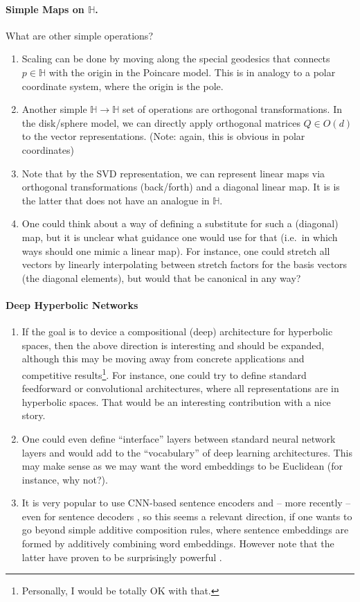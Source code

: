 \documentclass{article}
\begin{document}
\paragraph{Simple Maps on $\mathbb H$.}
What are other simple operations? 
\begin{enumerate}
\item Scaling can be done by moving along the special geodesics that connects $p \in \mathbb H$ with the origin in the Poincare model. This is in analogy to a polar coordinate system, where the origin is the pole.
\item  Another simple $\mathbb H \to \mathbb H$ set of operations are orthogonal transformations. In the disk/sphere model, we can directly apply orthogonal matrices $Q \in O(d)$ to the vector representations. (Note: again, this is obvious in polar coordinates)  
\item Note that by the SVD representation, we can represent linear maps via orthogonal transformations (back/forth) and a diagonal linear map. It is is the latter that does not have an analogue in $\mathbb H$. 
\item One could think about a way of defining a substitute for such a (diagonal) map, but it is unclear what guidance one would use for that (i.e.~in which ways should one mimic a linear map). For instance, one could stretch all vectors by linearly interpolating between stretch factors for the basis vectors (the diagonal elements), but would that be canonical in any way? 
\end{enumerate}

\paragraph{Deep Hyperbolic Networks}

\begin{enumerate}
\item If the goal is to device a compositional (deep) architecture for hyperbolic spaces, then the above direction is interesting and should be expanded, although this may be moving away from concrete applications and competitive results\footnote{Personally, I would be totally OK with that.}. For instance, one could try to define standard feedforward or convolutional architectures, where all representations are in hyperbolic spaces. That would be an interesting contribution with a nice story. 
\item One could even define ``interface'' layers between standard neural network layers and would add to the ``vocabulary'' of deep learning architectures. This may make sense as we may want the word embeddings to be Euclidean (for instance, why not?). 
\item It is very popular to use CNN-based sentence encoders \cite{kalchbrenner2014convolutional} and -- more recently -- even for sentence decoders \cite{zhang2017deconvolutional}, so this seems a relevant direction, if one wants to go beyond simple additive composition rules, where sentence embeddings are formed by additively combining word embeddings. However note that the latter have proven to be surprisingly powerful \cite{wieting2016charagram,hill2016learning,pagliardini2017unsupervised}. 
\end{enumerate}
\end{document}
